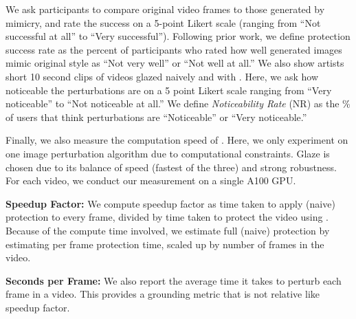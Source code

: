 \begin{packed_itemize}
  \indent We ask participants to compare original
  video frames to those generated by mimicry, and rate the success on a 5-point
  Likert scale (ranging from ``Not successful at all'' to ``Very
  successful''). Following prior work, we define protection success rate as
  the percent of participants who rated how well generated images mimic
  original style as ``Not very well'' or ``Not well at all.'' We also show
  artists short 10 second clips of videos glazed naively and with
  \system. Here, we ask how noticeable the perturbations are on a 5 point
  Likert scale ranging from ``Very noticeable'' to ``Not noticeable at all.''
  We define \textit{Noticeability Rate} (NR) as the \% of users that think
  perturbations are ``Noticeable'' or ``Very noticeable.''
\end{packed_itemize}

Finally, we also measure the computation speed of \system. Here, we only experiment on one image perturbation algorithm due to computational constraints. Glaze is chosen due to its balance of speed (fastest of the three) and strong robustness. For each video, we conduct our measurement on a single A100 GPU.
\begin{packed_itemize}
\item \textbf{Speedup Factor:} We compute speedup factor as time taken to apply (naive)
  protection to every frame, divided by time taken to protect the video using
  \system.  Because of the compute time involved, we estimate full (naive) protection by estimating per frame protection time, scaled up by number of frames in the video.
\item \textbf{Seconds per Frame:} We also report the average time it takes to
  perturb each frame in a video. This provides a grounding metric that is not
  relative like speedup factor.
\end{packed_itemize}

